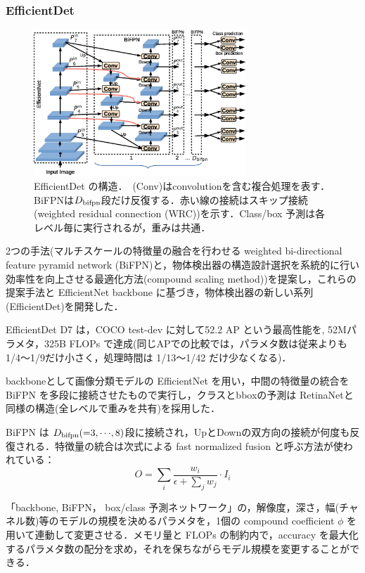 \documentclass[originalpaper,fleqn]{jsaiart}     %
\begin{document}
\subsubsection{EfficientDet}
\begin{figure}[tb]
    \begin{center}
        \includegraphics[width=8cm,clip]{fig/archi_EfficientDet.eps}
    \end{center}
    \caption{ EfficientDet の構造．\ (Conv)はconvolutionを含む複合処理を表す．BiFPNは$D_{\rm bifpn}$段だけ反復する．赤い線の接続はスキップ接続(weighted residual connection (WRC))を示す．Class/box 予測は各レベル毎に実行されるが，重みは共通．}
    \label{fig:archi_EfficientDet}
\end{figure}
2つの手法(マルチスケールの特徴量の融合を行わせる weighted bi-directional feature pyramid network (BiFPN)と，物体検出器の構造設計選択を系統的に行い効率性を向上させる最適化方法(compound scaling method))を提案し，これらの提案手法と EfficientNet backbone に基づき，物体検出器の新しい系列 (EfficientDet)を開発した\cite{TPL20}．

EfficientDet D7 は，COCO test-dev に対して52.2 AP という最高性能を, 52Mパラメタ，325B FLOPs で達成(同じAPでの比較では，パラメタ数は従来よりも1/4〜1/9だけ小さく，処理時間は 1/13〜1/42 だけ少なくなる)．

backboneとして画像分類モデルの EfficientNet\cite{TanLe19} を用い，中間の特徴量の統合を BiFPN を多段に接続させたもので実行し，クラスとbboxの予測は RetinaNet\cite{LGGHD17}と同様の構造(全レベルで重みを共有)を採用した．

BiFPN は $D_{\rm bifpn} ({=}3,{\cdots},8)$段に接続され，UpとDownの双方向の接続が何度も反復される．特徴量の統合は次式による fast normalized fusion と呼ぶ方法が使われている：
$$ O = \sum_i\frac{w_i}{\epsilon + \sum_jw_j}\cdot I_i $$

「backbone, BiFPN， box/class 予測ネットワーク」の，解像度，深さ，幅(チャネル数)等のモデルの規模を決めるパラメタを，1個の compound coefficient $\phi$ を用いて連動して変更させる．メモリ量と FLOPs の制約内で，accuracy を最大化するパラメタ数の配分を求め，それを保ちながらモデル規模を変更することができる．
\end{document}
